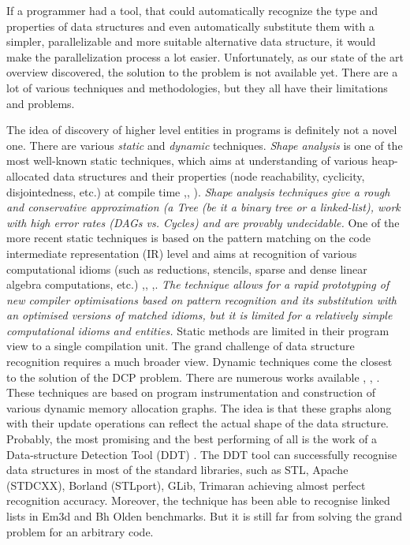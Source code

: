 \begin{description}[style=unboxed,leftmargin=0cm]
If a programmer had a tool, that could automatically recognize the type and properties of data structures and even automatically substitute them with a simpler, parallelizable and more suitable alternative data structure, it would make the parallelization process a lot easier. Unfortunately, as our state of the art overview discovered, the solution to the problem is not available yet. There are a lot of various techniques and methodologies, but they all have their limitations and problems.
\item[\textit{Limitations of "The state of the art" work}] The idea of discovery of higher level entities in programs is definitely not a novel one. There are various \textit{static} and \textit{dynamic} techniques. \textit{Shape analysis} is one of the most well-known static techniques, which aims at understanding of various heap-allocated data structures and their properties (node reachability, cyclicity, disjointedness, etc.) at compile time \cite{Sagiv:1999:PSA:292540.292552},\cite{Wilhelm:2000:SA:647476.760384}, \cite{Ghiya:1996:TDC:237721.237724}). \textit{Shape analysis techniques give a rough and conservative approximation (a \textit{Tree} (be it a binary tree or a linked-list), work with high error rates (\textit{DAGs} vs. \textit{Cycles}) and are provably undecidable.} One of the more recent static techniques is based on the pattern matching on the code intermediate representation (IR) level and aims at recognition of various computational idioms (such as reductions, stencils, sparse and dense linear algebra computations, etc.) \cite{Ginsbach:2018:CDS:3178372.3179515},\cite{Ginsbach:2017:DEG:3049832.3049862}, \cite{Ginsbach:2018:AML:3296957.3173182},\cite{Ginsbach:2018:AML:3296957.3173182}. \textit{The technique allows for a rapid prototyping of new compiler optimisations based on pattern recognition and its substitution with an optimised versions of matched idioms, but it is limited for a relatively simple computational idioms and entities.} 
\quad Static methods are limited in their program view to a single compilation unit. The grand challenge of data structure recognition requires a much broader view. Dynamic techniques come the closest to the solution of the DCP problem. There are numerous works available \cite{Rupprecht:2017:DID:3155562.3155607}\cite{Haller:2016:SDS:2938006.2938029}, \cite{Haller:2016:SDS:2938006.2938029}, \cite{Rupprecht:2017:DID:3155562.3155607}. These techniques are based on program instrumentation and construction of various dynamic memory allocation graphs. The idea is that these graphs along with their update operations can reflect the actual shape of the data structure. Probably, the most promising and the best performing of all is the work of a Data-structure Detection Tool (DDT) \cite{1669122}. The DDT tool can successfully recognise data structures in most of the standard libraries, such as STL, Apache (STDCXX), Borland (STLport), GLib, Trimaran achieving almost perfect recognition accuracy. Moreover, the technique has been able to recognise linked lists in Em3d and Bh Olden benchmarks. But it is still far from solving the grand problem for an arbitrary code. 

\end{description}
